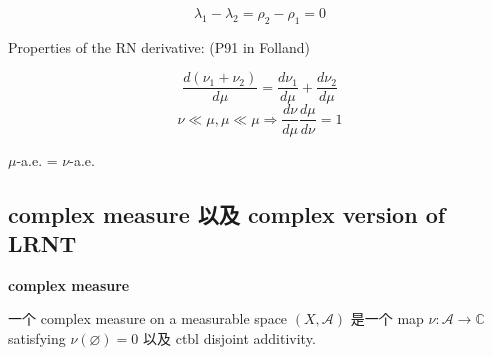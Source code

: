 \documentclass{qlnotes-export}
\begin{document}
\[\lambda_{1} - \lambda_{2} = \rho_{2} - \rho_{1} = 0\]

Properties of the RN derivative: (P91 in Folland)

\[\frac{d(\nu_{1} + \nu_{2})}{d\mu} = \frac{d\nu_{1}}{d\mu} + \frac{d\nu_{2}}{d\mu}\]\[\nu \ll \mu,\mu \ll \mu\Longrightarrow\frac{d\nu}{d\mu}\frac{d\mu}{d\nu} = 1\]

\(\mu\)-a.e. = \(\nu\)-a.e.

\subsection{complex measure 以及 complex version of LRNT}\label{complex-measure-ux4ee5ux53ca-complex-version-of-lrnt}

\begin{definition}{\protect{}\label{kn-complex-measure}{\textbf{complex
measure}}}

一个 complex measure on a measurable space \((X,\mathcal{A})\) 是一个 map \(\nu:\mathcal{A}\rightarrow{\mathbb{C}}\) satisfying \(\nu(\varnothing) = 0\) 以及 ctbl disjoint additivity.

\end{definition}
\end{document}
